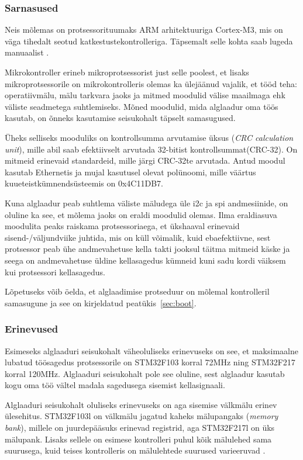 \documentclass[12pt,a4paper]{article}
\begin{document}
\subsubsection{Sarnasused}
\label{sec:mcu:same}
Neis mõlemas on protsessorituumaks ARM arhitektuuriga Cortex-M3, mis on väga
tihedalt seotud katkestustekontrolleriga. Täpsemalt selle kohta saab lugeda
manuaalist \cite{CM3pm}.

Mikrokontroller erineb mikroprotsessorist just selle poolest, et lisaks
mikroprotsessorile on mikrokontrolleris olemas ka ülejäänud vajalik, et tööd
teha: operatiivmälu, mälu tarkvara jaoks ja mitmed moodulid välise maailmaga ehk
väliste seadmetega suhtlemiseks. Mõned moodulid, mida alglaadur oma töös
kasutab, on õnneks kasutamise seisukohalt täpselt samasugused.

Üheks selliseks mooduliks on kontrollsumma arvutamise üksus (\textit{CRC
calculation unit}), mille abil saab efektiivselt arvutada 32-bitist
kontrollsummat(CRC-32). On mitmeid erinevaid standardeid, mille järgi CRC-32te
arvutada. Antud moodul kasutab Ethernetis ja mujal kasutusel olevat polünoomi,
mille väärtus kuueteistkümnendsüsteemis on 0x4C11DB7. 

Kuna alglaadur peab suhtlema väliste mäludega üle \gls{i2c} ja \gls{spi}
andmesiinide, on oluline ka see, et mõlema jaoks on eraldi moodulid olemas. Ilma
eraldiasuva moodulita peaks raiskama protsessoriaega, et ükshaaval erinevaid
sisend-/väljundviike juhtida, mis on küll võimalik, kuid ebaefektiivne, sest
protsessor peab ühe andmevahetuse kella takti jooksul täitma mitmeid
käske ja seega on andmevahetuse üldine kellasagedus kümneid kuni sadu
kordi väiksem kui protsessori kellasagedus.

Lõpetuseks võib öelda, et alglaadimise protseduur on mõlemal kontrolleril
samasugune ja see on kirjeldatud peatükis~\ref{sec:boot}.

\subsubsection{Erinevused}
Esimeseks alglaaduri seisukohalt väheoluliseks erinevuseks on see, et
maksimaalne lubatud töösagedus protsessorile on STM32F103 korral 72MHz ning
STM32F217 korral 120MHz. Alglaaduri seisukohalt pole see oluline, sest alglaadur
kasutab kogu oma töö vältel madala sagedusega sisemist kellasignaali.

Alglaaduri seisukohalt oluliseks erinevuseks on aga sisemise välkmälu erinev
ülesehitus. STM32F103l on välkmälu jagatud kaheks mälupangaks (\textit{memory
bank}), millele on juurdepääsuks erinevad registrid, aga STM32F217l on üks
mälupank. Lisaks sellele on esimese kontrolleri puhul kõik mälulehed sama
suurusega, kuid teises kontrolleris on mälulehtede suurused varieeruvad
\cite{f1fpm,f2fpm}.
\end{document}
